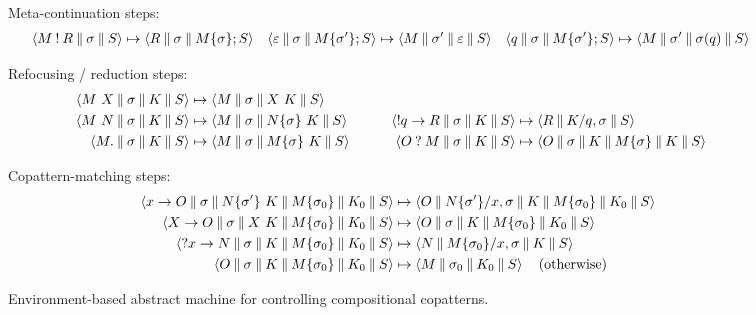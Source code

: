 \begin{figure*}
\centering

Meta-continuation steps:
\begin{align*}
  \braket{M \ans R \cmid \sigma \cmid S}
  &\mapsto
  \braket{R \cmid \sigma \cmid M\clos{\sigma}; S}
  &
  \braket{\varepsilon \cmid \sigma \cmid M\clos{\sigma'}; S}
  &\mapsto
  \braket{M \cmid \sigma' \cmid \varepsilon \cmid S}
  &
  \braket{q \cmid \sigma \cmid M\clos{\sigma'}; S}
  &\mapsto
  \braket{M \cmid \sigma' \cmid \sigma(q) \cmid S}
\end{align*}

Refocusing / reduction steps:
\begin{align*}
  \braket{M ~ X \cmid \sigma \cmid K \cmid S}
  &\mapsto
  \braket{M \cmid \sigma \cmid X ~ K \cmid S}
  \\
  \braket{M ~ N \cmid \sigma \cmid K \cmid S}
  &\mapsto
  \braket{M \cmid \sigma \cmid N\clos{\sigma} ~ K \cmid S}
  &\qquad
  \braket{\ans q \to R \cmid \sigma \cmid K \cmid S}
  &\mapsto
  \braket{R \cmid \asub{q}{K},\sigma \cmid S}
  \\
  \braket{M. \cmid \sigma \cmid K \cmid S}
  &\mapsto
  \braket{M \cmid \sigma \cmid M\clos{\sigma} ~ K \cmid S}
  &\qquad
  \braket{O \ask M \cmid \sigma \cmid K \cmid S}
  &\mapsto
  \braket{O \cmid \sigma \cmid K \cmid M \clos\sigma \cmid K \cmid S}
\end{align*}

Copattern-matching steps:
\begin{align*}
  \braket{x \to O \cmid \sigma \cmid N\clos{\sigma'}~K \cmid M \clos{\sigma_0} \cmid K_0 \cmid S}
  &\mapsto
  \braket{O \cmid \asub{x}{N\clos{\sigma'}}, \sigma \cmid K \cmid M \clos{\sigma_0} \cmid K_0 \cmid S}
  \\
  \braket{X \to O \cmid \sigma \cmid X~K \cmid M \clos{\sigma_0} \cmid K_0 \cmid S}
  &\mapsto
  \braket{O \cmid \sigma \cmid K \cmid M\clos{\sigma_0} \cmid K_0 \cmid S}
  \\
  \braket{\ask x \to N \cmid \sigma \cmid K \cmid M\clos{\sigma_0} \cmid K_0 \cmid S}
  &\mapsto
  \braket{N \cmid \asub{x}{M\clos{\sigma_0}}, \sigma \cmid K \cmid S}
  \\
  \braket{O \cmid \sigma \cmid K \cmid M\clos{\sigma_0} \cmid K_0 \cmid S}
  &\mapsto
  \braket{M \cmid \sigma_0 \cmid K_0 \cmid S}
  \quad(\text{otherwise})
\end{align*}
\caption{Environment-based abstract machine for controlling compositional copatterns.}
\label{fig:comp-copat-machine}
\end{figure*}


